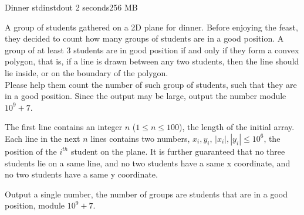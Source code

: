 \begin{problem}{Dinner}
{stdin}{stdout}
{2 seconds}{256 MB}{}

A group of students gathered on a 2D plane for dinner. Before enjoying the feast, they decided to count how many groups of students are in a good position. A group of at least 3 students are in good position if and only if they form a convex polygon, that is, if a line is drawn between any two students, then the line should lie inside, or on the boundary of the polygon. \\
Please help them count the number of such group of students, such that they are in a good position. Since the output may be large, output the number module $10^9 + 7$.

\InputFile
The first line contains an integer $n$ ($1 \leq n \leq 100$), the length of the initial array. Each line in the next $n$ lines contains two numbers, $x_i, y_i$, $|x_i|, |y_i| \leq 10^6$, the position of the $i^{th}$ student on the plane. It is further guaranteed that no three students lie on a same line, and no two students have a same x coordinate, and no two students have a same y coordinate.

\OutputFile

Output a single number, the number of groups are students that are in a good position, module $10^9 + 7$.

\Examples

\begin{example}
%
\end{example}

\begin{example}
%
\end{example}

\begin{example}
%
\end{example}

\end{problem}
